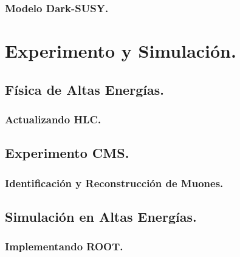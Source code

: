 \documentclass[12pt,english]{report}
\begin{document}
		
		\subsection{Modelo Dark-SUSY.}		
		
		
				


\chapter{Experimento y Simulación.}

		
	\section{Física de Altas Energías.}
	
		
		\subsection{Actualizando HLC.}	
		
	
	\section{Experimento CMS.}
	
	
	
		\subsection{Identificación y Reconstrucción de Muones.}
		
		
	\section{Simulación en Altas Energías.}
	
	
		\subsection{Implementando ROOT.}\label{C_root}
		
		
\end{document}
